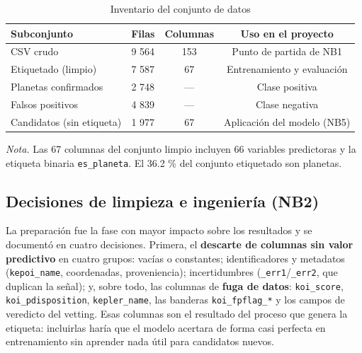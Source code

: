 \documentclass[a4paper,12pt]{article}
\begin{document}
  \begin{table}[H]
    \caption{Inventario del conjunto de datos}
    \label{tab:inventario}
    \begin{tabular}{@{}lccc@{}}
      \toprule
      Subconjunto & Filas & Columnas & Uso en el proyecto \\
      \midrule
      CSV crudo & 9 564 & 153 & Punto de partida de NB1 \\
      Etiquetado (limpio) & 7 587 & 67 & Entrenamiento y evaluación \\
      \quad Planetas confirmados & 2 748 & --- & Clase positiva \\
      \quad Falsos positivos & 4 839 & --- & Clase negativa \\
      Candidatos (sin etiqueta) & 1 977 & 67 & Aplicación del modelo (NB5) \\
      \bottomrule
    \end{tabular}
    \par\medskip
    \begin{minipage}{\linewidth}
      \footnotesize\textit{Nota.} Las 67 columnas del conjunto limpio incluyen 66
      variables predictoras y la etiqueta binaria \texttt{es\_planeta}. El 36.2 \%
      del conjunto etiquetado son planetas.
    \end{minipage}
  \end{table}

  \subsection{Decisiones de limpieza e ingeniería (NB2)}

  La preparación fue la fase con mayor impacto sobre los resultados y se documentó
  en cuatro decisiones. Primera, el \textbf{descarte de columnas sin valor
  predictivo} en cuatro grupos: vacías o constantes; identificadores y metadatos
  (\texttt{kepoi\_name}, coordenadas, proveniencia); incertidumbres
  (\texttt{\_err1}/\texttt{\_err2}, que duplican la señal); y, sobre todo, las
  columnas de \textbf{fuga de datos}: \texttt{koi\_score},
  \texttt{koi\_pdisposition}, \texttt{kepler\_name}, las banderas
  \texttt{koi\_fpflag\_*} y los campos de veredicto del vetting. Esas columnas son
  el resultado del proceso que genera la etiqueta: incluirlas haría que el modelo
  acertara de forma casi perfecta en entrenamiento sin aprender nada útil para
  candidatos nuevos.
\end{document}
